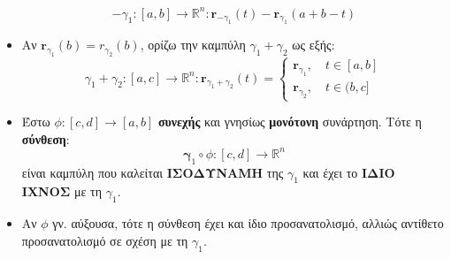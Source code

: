 \documentclass[11pt,a4paper,titlepage,draft]{article}
\begin{document}
\begin{itemize}
\[ -{\gamma_1} : [a,b] \rightarrow \mathbb R^n : \mathbf r_{-\gamma_1}(t) - \mathbf r_{\gamma_1}(a+b-t)
\]

\item Αν \(\mathbf r_{\gamma_1}(b) = r_{\gamma_2}(b)\), ορίζω την καμπύλη \( \gamma_1+\gamma_2 \) ως εξής:
\[
\gamma_1+\gamma_2: [a,c] \rightarrow \mathbb R^n:
\mathbf r_{\gamma_1+\gamma_2}(t) =
\begin{cases}
\mathbf r_{\gamma_1}, \quad t \in [a,b] \\
\mathbf r_{\gamma_2}, \quad t \in (b, c]
\end{cases}
\]

\item Έστω \( \phi: [c,d] \rightarrow [a,b] \) \textbf{συνεχής} και γνησίως \textbf{μονότονη} συνάρτηση. Τότε η \textbf{σύνθεση}: \[ \mathbf \gamma_1 \circ \phi: [c, d] \rightarrow \mathbb R ^n \]
είναι καμπύλη που καλείται \textbf{ΙΣΟΔΥΝΑΜΗ} της \(\gamma_1\) και έχει το \textbf{ΙΔΙΟ ΙΧΝΟΣ} με τη \(\gamma_1\).

\item Αν \(\phi\) γν. αύξουσα, τότε η σύνθεση έχει και ίδιο προσανατολισμό, αλλιώς αντίθετο προσανατολισμό σε σχέση με τη \(\gamma_1\).
\end{itemize}
\end{document}
